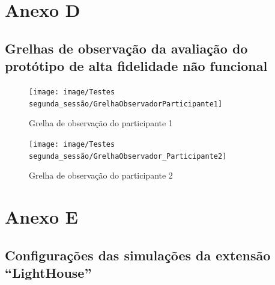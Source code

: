 \documentclass[11pt, twoside]{report}
\begin{document}
	\chapter*{Anexo D}
		\section*{Grelhas de observação da avaliação do protótipo de alta fidelidade não funcional}
		\begin{landscape}
			\clearpage
			\pagestyle{empty}
			
			\begin{figure}[H] 
				\centering 							\texttt{[image: image/Testes segunda\_sessão/GrelhaObservadorParticipante1]}
				\caption{Grelha de observação do participante 1}
				
			\end{figure}
			\begin{figure}[H] 
				\centering 							\texttt{[image: image/Testes segunda\_sessão/GrelhaObservador\_Participante2]}
				\caption{Grelha de observação do participante 2}
			\end{figure}
			
			
			\end{landscape}
		
		\chapter*{Anexo E}
		\section*{Configurações das simulações da extensão ``LightHouse''}
			\pagestyle{empty}
			
\end{document}
